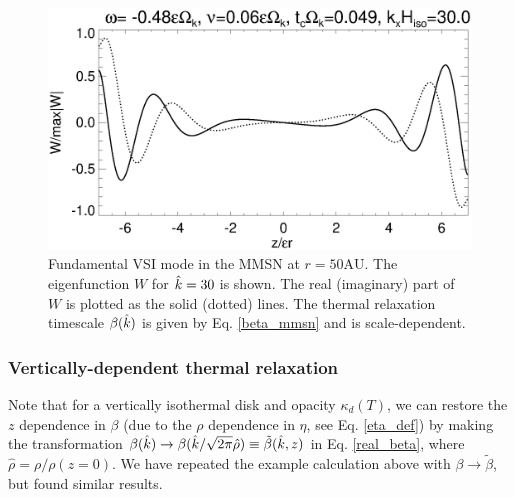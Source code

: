 \begin{figure}
   \includegraphics[width=\linewidth,clip=true,trim=0cm 0.0cm 0cm
  0cm]{figures/eigenvectorW_mmsnkx30.ps}
  \caption{Fundamental VSI mode in the MMSN at 
    $r=50\mathrm{AU}$. The eigenfunction $W$ for $\hat{k}=30$ is shown. The real (imaginary)
    part of $W$ is plotted as the solid (dotted)
    lines. The thermal relaxation timescale $\beta(\hat{k})$ is given by
    Eq. \ref{beta_mmsn} and is scale-dependent. \label{mmsn_eigenW}}    
\end{figure}

\subsubsection{Vertically-dependent thermal relaxation} 
Note that for a vertically isothermal disk and opacity $\kappa_d(T)$, 
we can restore the $z$ dependence in $\beta$ (due to the $\rho$
dependence in  $\eta$, see Eq. \ref{eta_def}) by making the transformation
$\beta(\hat{k})\to\beta(\hat{k}/\sqrt{2\pi}\hat{\rho})\equiv 
\tilde{\beta}(\hat{k},z)$ in  Eq. \ref{real_beta}, where
$\hat{\rho}=\rho/\rho(z=0)$.  We have repeated the example
calculation above with $\beta\to\tilde{\beta}$, but found similar
results. 



